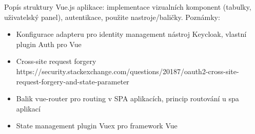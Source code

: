 \documentclass[12pt]{article}
\begin{document}
Popís struktury Vue.js aplikace: implementace vizualních komponent
(tabulky, uživatelský panel), autentikace, použite nastroje/baličky.
\newline
\newline
Poznámky:
\begin{itemize}
    \item Konfigurace adapteru pro identity management nástroj Keycloak, vlastní plugin Auth pro Vue
    \item Cross-site request forgery https://security.stackexchange.com/questions/20187/oauth2-cross-site-request-forgery-and-state-parameter
    \item Balik vue-router pro routing v SPA aplikacích, princip routování u spa aplikací
    \item State management plugin Vuex pro framework Vue

\end{itemize}
\end{document}
